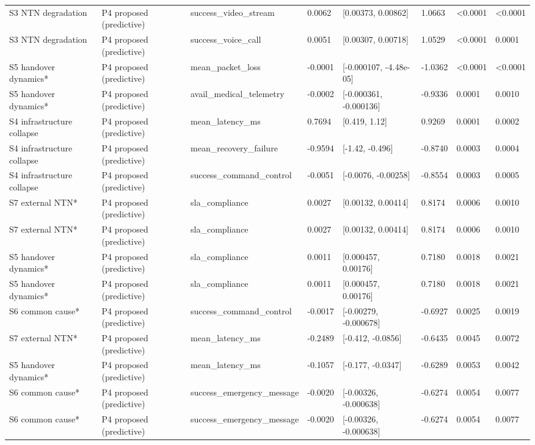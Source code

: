 \begin{tabular}{llllllll}
S3 NTN degradation & P4 proposed (predictive) & success\_video\_stream & 0.0062 & [0.00373, 0.00862] & 1.0663 & <0.0001 & <0.0001 \\
S3 NTN degradation & P4 proposed (predictive) & success\_voice\_call & 0.0051 & [0.00307, 0.00718] & 1.0529 & <0.0001 & 0.0001 \\
S5 handover dynamics* & P4 proposed (predictive) & mean\_packet\_loss & -0.0001 & [-0.000107, -4.48e-05] & -1.0362 & <0.0001 & <0.0001 \\
S5 handover dynamics* & P4 proposed (predictive) & avail\_medical\_telemetry & -0.0002 & [-0.000361, -0.000136] & -0.9336 & 0.0001 & 0.0010 \\
S4 infrastructure collapse & P4 proposed (predictive) & mean\_latency\_ms & 0.7694 & [0.419, 1.12] & 0.9269 & 0.0001 & 0.0002 \\
S4 infrastructure collapse & P4 proposed (predictive) & mean\_recovery\_failure & -0.9594 & [-1.42, -0.496] & -0.8740 & 0.0003 & 0.0004 \\
S4 infrastructure collapse & P4 proposed (predictive) & success\_command\_control & -0.0051 & [-0.0076, -0.00258] & -0.8554 & 0.0003 & 0.0005 \\
S7 external NTN* & P4 proposed (predictive) & sla\_compliance & 0.0027 & [0.00132, 0.00414] & 0.8174 & 0.0006 & 0.0010 \\
S7 external NTN* & P4 proposed (predictive) & sla\_compliance & 0.0027 & [0.00132, 0.00414] & 0.8174 & 0.0006 & 0.0010 \\
S5 handover dynamics* & P4 proposed (predictive) & sla\_compliance & 0.0011 & [0.000457, 0.00176] & 0.7180 & 0.0018 & 0.0021 \\
S5 handover dynamics* & P4 proposed (predictive) & sla\_compliance & 0.0011 & [0.000457, 0.00176] & 0.7180 & 0.0018 & 0.0021 \\
S6 common cause* & P4 proposed (predictive) & success\_command\_control & -0.0017 & [-0.00279, -0.000678] & -0.6927 & 0.0025 & 0.0019 \\
S7 external NTN* & P4 proposed (predictive) & mean\_latency\_ms & -0.2489 & [-0.412, -0.0856] & -0.6435 & 0.0045 & 0.0072 \\
S5 handover dynamics* & P4 proposed (predictive) & mean\_latency\_ms & -0.1057 & [-0.177, -0.0347] & -0.6289 & 0.0053 & 0.0042 \\
S6 common cause* & P4 proposed (predictive) & success\_emergency\_message & -0.0020 & [-0.00326, -0.000638] & -0.6274 & 0.0054 & 0.0077 \\
S6 common cause* & P4 proposed (predictive) & success\_emergency\_message & -0.0020 & [-0.00326, -0.000638] & -0.6274 & 0.0054 & 0.0077 \\

\end{tabular}
